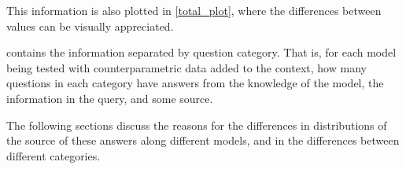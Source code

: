 This information is also plotted in \cref{total_plot}, where the differences between %
values can be visually appreciated.

 contains the information separated by question category.
That is, for each model being tested with counterparametric data added to the context, how many questions in each category have answers from the \Parametric{} knowledge of the model, the \Contextual{} information in the query, and some \Other{} source.

The following sections discuss the reasons for the differences in distributions of the source of these answers along different models, and in the differences between different categories.
